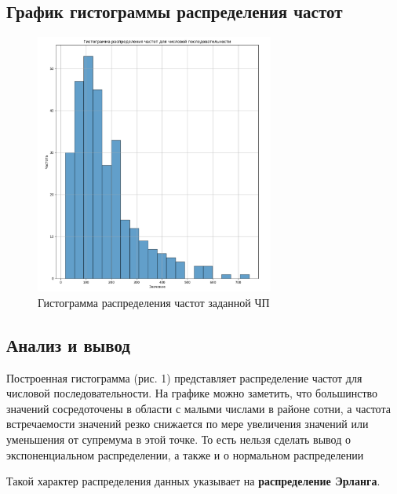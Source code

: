 \subsection{График гистограммы распределения частот}

\FloatBarrier
\begin{figure}[h]
	\centering
	\includegraphics[width=0.7\textwidth]{../data/histogram.png}
	\caption{Гистограмма распределения частот заданной ЧП}
\end{figure}
\FloatBarrier

\subsection{Анализ и вывод}

Построенная гистограмма (рис. 1) представляет распределение частот для числовой последовательности. На графике можно заметить, что большинство значений сосредоточены в области с малыми числами в районе сотни, а частота встречаемости значений резко снижается по мере увеличения значений или уменьшения от супремума в этой точке. То есть нельзя сделать вывод о экспоненциальном распределении, а также и о нормальном распределении

Такой характер распределения данных указывает на \textbf{распределение Эрланга}. 

